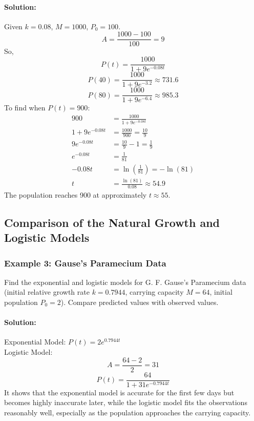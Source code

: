 \documentclass{article}
\begin{document}
\paragraph{Solution:}
Given $k = 0.08$, $M = 1000$, $P_0 = 100$.
\[
A = \frac{1000 - 100}{100} = 9
\]
So,
\[
P(t) = \frac{1000}{1 + 9e^{-0.08t}}
\]
\[
P(40) = \frac{1000}{1 + 9e^{-3.2}} \approx 731.6
\]
\[
P(80) = \frac{1000}{1 + 9e^{-6.4}} \approx 985.3
\]
To find when $P(t) = 900$:
\begin{align*}
900 &= \frac{1000}{1 + 9e^{-0.08t}} \\
1 + 9e^{-0.08t} &= \frac{1000}{900} = \frac{10}{9} \\
9e^{-0.08t} &= \frac{10}{9} - 1 = \frac{1}{9} \\
e^{-0.08t} &= \frac{1}{81} \\
-0.08t &= \ln\left(\frac{1}{81}\right) = -\ln(81) \\
t &= \frac{\ln(81)}{0.08} \approx 54.9
\end{align*}
The population reaches 900 at approximately $t \approx 55$.

\subsection*{Comparison of the Natural Growth and Logistic Models}

\subsubsection*{Example 3: Gause's Paramecium Data}
Find the exponential and logistic models for G. F. Gause's Paramecium data (initial relative growth rate $k = 0.7944$, carrying capacity $M = 64$, initial population $P_0 = 2$). Compare predicted values with observed values.

\paragraph{Solution:}
Exponential Model: $P(t) = 2e^{0.7944t}$ \\
Logistic Model:
\[
A = \frac{64 - 2}{2} = 31
\]
\[
P(t) = \frac{64}{1 + 31e^{-0.7944t}}
\]
It shows that the exponential model is accurate for the first few days but becomes highly inaccurate later, while the logistic model fits the observations reasonably well, especially as the population approaches the carrying capacity.
\end{document}
